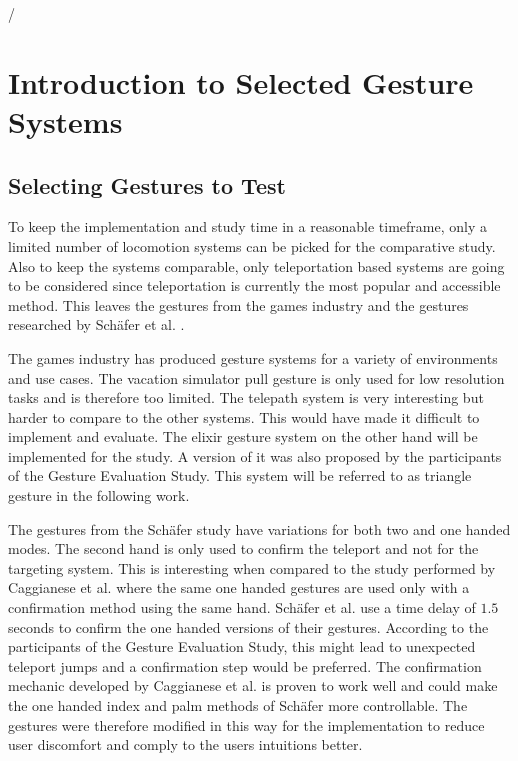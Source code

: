/\chapter{Introduction to Selected Gesture Systems} %
\label{cha:Introduction to Selected Gesture Systems}

\section{Selecting Gestures to Test}

To keep the implementation and study time in a reasonable timeframe, only a limited number of locomotion systems can be picked for the comparative study. Also to keep the systems comparable, only teleportation based systems are going to be considered since teleportation is currently the most popular and accessible method. This leaves the gestures from the games industry and the gestures researched by Schäfer et al. \cite{Schafer2021}. 

The games industry has produced gesture systems for a variety of environments and use cases. The vacation simulator pull gesture is only used for low resolution tasks and is therefore too limited. The telepath system is very interesting but harder to compare to the other systems. This would have made it difficult to implement and evaluate. %
The elixir gesture system on the other hand will be implemented for the study. A version of it was also proposed by the participants of the Gesture Evaluation Study. This system will be referred to as triangle gesture in the following work. %

The gestures from the Schäfer study have variations for both two and one handed modes. The second hand is only used to confirm the teleport and not for the targeting system. 
This is interesting when compared to the study performed by Caggianese et al. \cite{Caggianese} where the same one handed gestures are used only with a confirmation method using the same hand. Schäfer et al. use a time delay of $1.5$ seconds to confirm the one handed versions of their gestures. According to the participants of the Gesture Evaluation Study, this might lead to unexpected teleport jumps and a confirmation step would be preferred. The confirmation mechanic developed by Caggianese et al. is proven to work well and could make the one handed index and palm methods of Schäfer more controllable. The gestures were therefore modified in this way for the implementation to reduce user discomfort and comply to the users intuitions better.

